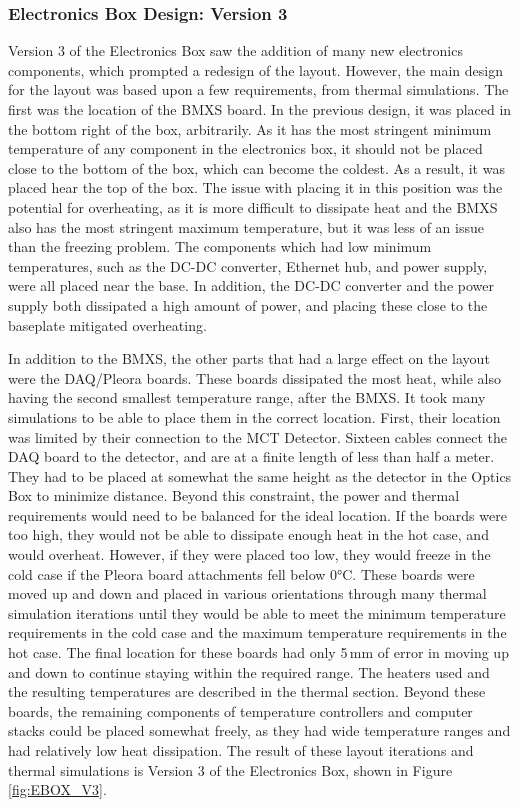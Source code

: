 \subsubsection{Electronics Box Design: Version 3}
Version 3 of the Electronics Box saw the addition of many new electronics components, which prompted a redesign of the layout. However, the main design for the layout was based upon a few requirements, from thermal simulations. The first was the location of the BMXS board. In the previous design, it was placed in the bottom right of the box, arbitrarily. As it has the most stringent minimum temperature of any component in the electronics box, it should not be placed close to the bottom of the box, which can become the coldest. As a result, it was placed hear the top of the box. The issue with placing it in this position was the potential for overheating, as it is more difficult to dissipate heat and the BMXS also has the most stringent maximum temperature, but it was less of an issue than the freezing problem. The components which had low minimum temperatures, such as the DC-DC converter, Ethernet hub, and power supply, were all placed near the base. In addition, the DC-DC converter and the power supply both dissipated a high amount of power, and placing these close to the baseplate mitigated overheating. 

In addition to the BMXS, the other parts that had a large effect on the layout were the DAQ/Pleora boards. These boards dissipated the most heat, while also having the second smallest temperature range, after the BMXS. It took many simulations to be able to place them in the correct location. First, their location was limited by their connection to the MCT Detector. Sixteen cables connect the DAQ board to the detector, and are at a finite length of less than half a meter. They had to be placed at somewhat the same height as the detector in the Optics Box to minimize distance. Beyond this constraint, the power and thermal requirements would need to be balanced for the ideal location. If the boards were too high, they would not be able to dissipate enough heat in the hot case, and would overheat. However, if they were placed too low, they would freeze in the cold case if the Pleora board attachments fell below 0°C. These boards were moved up and down and placed in various orientations through many thermal simulation iterations until they would be able to meet the minimum temperature requirements in the cold case and the maximum temperature requirements in the hot case. The final location for these boards had only 5\,mm of error in moving up and down to continue staying within the required range. The heaters used and the resulting temperatures are described in the thermal section. Beyond these boards, the remaining components of temperature controllers and computer stacks could be placed somewhat freely, as they had wide temperature ranges and had relatively low heat dissipation. The result of these layout iterations and thermal simulations is Version 3 of the Electronics Box, shown in Figure \ref{fig:EBOX_V3}.

